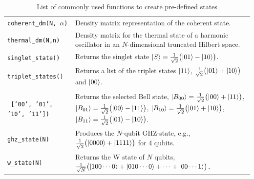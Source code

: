 \documentclass[preprint,3p,sort&compress]{elsarticle}
\def\code#1{\texttt{#1}}
\begin{document}
\begin{table}[ht]
\begin{tabular}{@{}lp{10cm}@{}}
        \code{coherent\_dm(N, $\alpha$)} & Density matrix representation of the coherent state. \\
        
        \code{thermal\_dm(N,n)} & Density matrix for the thermal state of a harmonic oscillator in an $N$-dimensional truncated Hilbert space. \\
     
        \code{singlet\_state()} & Returns the singlet state $\ket{S}=\frac{1}{\sqrt{2}}\bigl( \ket{01}-\ket{10} \bigr)$. \\
       
        \code{triplet\_states()} & Returns a list of the triplet states $\ket{11}$, $\frac{1}{\sqrt{2}}\bigl( \ket{01}+\ket{10} \bigr)$ and $\ket{00}$. \\
      
        \makecell{\code{bell\_state(}\\ \code{    ['00', '01', '10', '11'])}} & Returns the selected Bell state, 
        $\ket{B_{00}} = \frac1{\sqrt2}\bigl( \ket{00} + \ket{11} \bigr)$, 
        $\ket{B_{01}} = \frac1{\sqrt2}\bigl( \ket{00} - \ket{11} \bigr)$,
        $\ket{B_{10}} = \frac1{\sqrt2} \bigl( \ket{01} + \ket{10} \bigr)$, 
        $\ket{B_{11}} = \frac1{\sqrt2} \bigl( \ket{01} - \ket{10} \bigr)$.\\
        
        \code{ghz\_state(N)} & Produces the $N$-qubit GHZ-state, e.g., $\frac1{\sqrt2}\bigl( \ket{0000} + \ket{1111} \bigr)$ for 4 qubits. \\
        
        \code{w\_state(N)} & Returns the W  state of $N$ qubits, $\frac1{\sqrt N}\bigl( \ket{100 \cdots 0} + \ket{010 \cdots 0} + \dots + \ket{00 \cdots 1} \bigr)$. \\
       \bottomrule
    \end{tabular}
    \caption{List of commonly used functions to create pre-defined states}
    \label{tab:qutip_states_functions}
\end{table}
\end{document}
